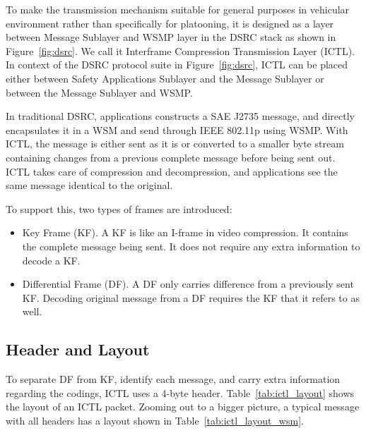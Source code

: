 \documentclass[12pt]{report}
\begin{document}
To make the transmission mechanism suitable for general purposes in vehicular environment rather than specifically for platooning, it is designed as a layer between Message Sublayer and WSMP layer in the DSRC stack as shown in Figure~\ref{fig:dsrc}. We call it Interframe Compression Transmission Layer (ICTL). In context of the DSRC protocol suite in Figure~\ref{fig:dsrc}, ICTL can be placed either between Safety Applications Sublayer and the Message Sublayer or between the Message Sublayer and WSMP.

In traditional DSRC, applications constructs a SAE J2735 message, and directly encapsulates it in a WSM and send through IEEE 802.11p using WSMP. With ICTL, the message is either sent as it is or converted to a smaller byte stream containing changes from a previous complete message before being sent out. ICTL takes care of compression and decompression, and applications see the same message identical to the original.

To support this, two types of frames are introduced:

\begin{itemize}
  \item Key Frame (KF). A KF is like an I-frame in video compression. It contains the complete message being sent. It does not require any extra information to decode a KF.
  \item Differential Frame (DF). A DF only carries difference from a previously sent KF. Decoding original message from a DF requires the KF that it refers to as well.
\end{itemize}

\subsection{Header and Layout}

To separate DF from KF, identify each message, and carry extra information regarding the codings, ICTL uses a 4-byte header. Table~\ref{tab:ictl_layout} shows the layout of an ICTL packet. Zooming out to a bigger picture, a typical message with all headers has a layout shown in Table~\ref{tab:ictl_layout_wsm}.
\end{document}
